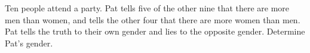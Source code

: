 Ten people attend a party. Pat tells five of the other nine that there are more men than women, and tells the other four that there are more women than men. Pat tells the truth to their own gender and lies to the opposite gender. Determine Pat's gender.
